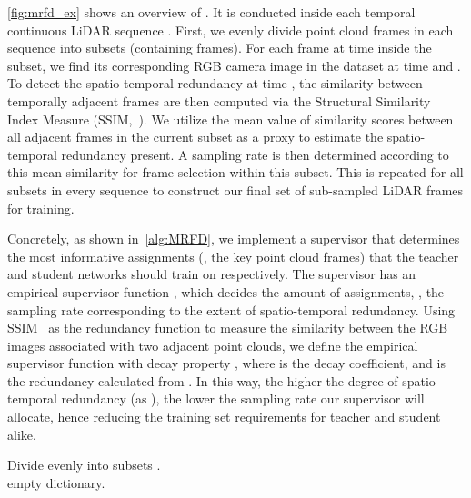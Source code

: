 \documentclass[10pt,twocolumn,letterpaper]{article}
\begin{document}
\cref{fig:mrfd_ex} shows an overview of {\samplshort}. It is conducted inside each temporal continuous LiDAR sequence . First, we evenly divide  point cloud frames in each sequence into  subsets (containing  frames). For each frame at time  inside the subset, we find its corresponding RGB camera image in the dataset at time  and . To detect the spatio-temporal redundancy at time , the similarity  between temporally adjacent frames are then computed via the Structural Similarity Index Measure (SSIM,~\cite{wang2004image}). We utilize the mean value of similarity scores between all adjacent frames in the current subset as a proxy to estimate the spatio-temporal redundancy present. A sampling rate is then determined according to this mean similarity for frame selection within this subset. This is repeated for all subsets in every sequence to construct our final set of sub-sampled LiDAR frames for training.

Concretely, as shown in~\cref{alg:MRFD}, we implement a {\samplshort} supervisor that determines the most informative assignments (\ie, the key point cloud frames) that the teacher and student networks should train on respectively. The {\samplshort} supervisor has an empirical supervisor function , which decides the amount of assignments, \ie, the sampling rate corresponding to the extent of spatio-temporal redundancy.  
Using SSIM~\cite{wang2004image} as the redundancy function  to measure the similarity between the RGB images associated with two adjacent point clouds, we define the empirical supervisor function  with decay property , where  is the decay coefficient, and  is the redundancy calculated from . In this way, the higher the degree of spatio-temporal redundancy (as ), the lower the sampling rate our {\samplshort} supervisor will allocate, hence reducing the training set requirements for teacher and student alike.

\begin{algorithm}[htp]
    \footnotesize
    \DontPrintSemicolon
    \SetAlgoLined
    \SetNoFillComment
    \caption{{\samplfull}.}
    \label{alg:MRFD}
    \SetAlgoVlined
    Divide  evenly into  subsets . \\
     empty dictionary. \\
\end{algorithm}
\end{document}
